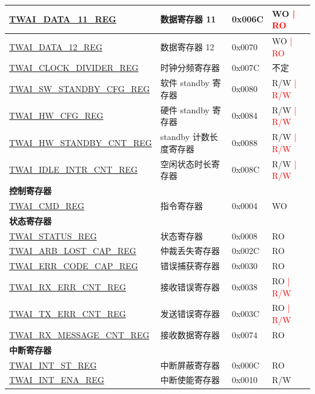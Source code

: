 \begin{longtable}{ | p{6cm} | p{6cm} | p{1.3cm} | p{2cm} | }
\hyperref[regdesc:TWAIDATA11REG]{TWAI\_DATA\_11\_REG} & 数据寄存器 11 & 0x006C & WO \textcolor{red}{| RO} \\ \hline
\hyperref[regdesc:TWAIDATA12REG]{TWAI\_DATA\_12\_REG} & 数据寄存器 12 & 0x0070 & WO \textcolor{red}{| RO} \\ \hline
\hyperref[regdesc:TWAICLOCKDIVIDERREG]{TWAI\_CLOCK\_DIVIDER\_REG} & 时钟分频寄存器 & 0x007C & 不定 \\ \hline
\hyperref[regdesc:TWAISWSTANDBYCFGREG]{TWAI\_SW\_STANDBY\_CFG\_REG} & 软件 standby 寄存器 & 0x0080 & R/W \textcolor{red}{| R/W} \\ \hline
\hyperref[regdesc:TWAIHWCFGREG]{TWAI\_HW\_CFG\_REG} & 硬件 standby 寄存器 & 0x0084 & R/W \textcolor{red}{| R/W} \\ \hline
\hyperref[regdesc:TWAIHWSTANDBYCNTREG]{TWAI\_HW\_STANDBY\_CNT\_REG} &  standby 计数长度寄存器 & 0x0088 & R/W \textcolor{red}{| R/W} \\ \hline
\hyperref[regdesc:TWAIIDLEINTRCNTREG]{TWAI\_IDLE\_INTR\_CNT\_REG} & 空闲状态时长寄存器 & 0x008C & R/W \textcolor{red}{| R/W} \\ \hline
\multicolumn{4}{|l|}{\textbf{控制寄存器}} \\ \hline
\hyperref[regdesc:TWAICMDREG]{TWAI\_CMD\_REG} & 指令寄存器 & 0x0004 & WO \\ \hline
\multicolumn{4}{|l|}{\textbf{状态寄存器}} \\ \hline
\hyperref[regdesc:TWAISTATUSREG]{TWAI\_STATUS\_REG} & 状态寄存器 & 0x0008 & RO \\ \hline
\hyperref[regdesc:TWAIARBLOSTCAPREG]{TWAI\_ARB\_LOST\_CAP\_REG} & 仲裁丢失寄存器 & 0x002C & RO \\ \hline
\hyperref[regdesc:TWAIERRCODECAPREG]{TWAI\_ERR\_CODE\_CAP\_REG} & 错误捕获寄存器 & 0x0030 & RO \\ \hline
\hyperref[regdesc:TWAIRXERRCNTREG]{TWAI\_RX\_ERR\_CNT\_REG} & 接收错误寄存器 & 0x0038 & RO \textcolor{red}{| R/W} \\ \hline
\hyperref[regdesc:TWAITXERRCNTREG]{TWAI\_TX\_ERR\_CNT\_REG} & 发送错误寄存器 & 0x003C & RO \textcolor{red}{| R/W} \\ \hline
\hyperref[regdesc:TWAIRXMESSAGECNTREG]{TWAI\_RX\_MESSAGE\_CNT\_REG} & 接收数据寄存器 & 0x0074 & RO \\ \hline
\multicolumn{4}{|l|}{\textbf{中断寄存器}} \\ \hline
\hyperref[regdesc:TWAIINTSTREG]{TWAI\_INT\_ST\_REG} & 中断屏蔽寄存器 & 0x000C & RO \\ \hline
\hyperref[regdesc:TWAIINTENAREG]{TWAI\_INT\_ENA\_REG} & 中断使能寄存器 & 0x0010 & R/W \\ \hline
\end{longtable}
